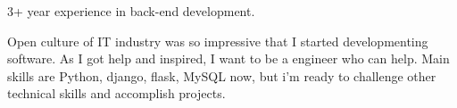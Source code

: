 

\begin{cvparagraph}

3+ year experience in back-end development.

Open culture of IT industry was so impressive that I started developmenting software. As I got help and inspired, I want to be a engineer who can help.
Main skills are Python, django, flask, MySQL now, but i'm ready to challenge other technical skills and accomplish projects.

\end{cvparagraph}
